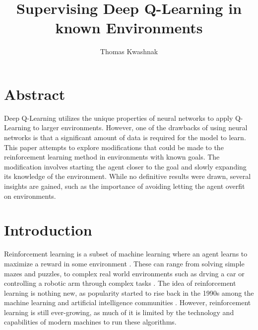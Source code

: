 \documentclass[12pt,letterpaper]{article}
\author{Thomas Kwashnak}
\title{Supervising Deep Q-Learning in known Environments}
\begin{document}
\maketitle

\newpage

\section{Abstract}

Deep Q-Learning utilizes the unique properties of neural networks to apply Q-Learning to larger environments.
However, one of the drawbacks of using neural networks is that a significant amount of data is required for the model to learn. 
This paper attempts to explore modifications that could be made to the reinforcement learning method in environments with known goals.
The modification involves starting the agent closer to the goal and slowly expanding its knowledge of the environment.
While no definitive results were drawn, several insights are gained, such as the importance of avoiding letting the agent overfit on environments.

\section{Introduction}

Reinforcement learning is a subset of machine learning where an agent learns to maximize a reward in some environment \cite{article_reinforcement_learning_survey}.
These can range from solving simple mazes and puzzles, to complex real world environments such as drving a car or controlling a robotic arm through complex tasks \cite{article_deep_learning_hybrid_quantum}.
The idea of reinforcement learning is nothing new, as popularity started to rise back in the 1990s among the machine learning and artificial intelligence communities \cite{article_reinforcement_learning_survey}.
However, reinforcement learning is still ever-growing, as much of it is limited by the technology and capabilities of modern machines to run these algorithms.
\end{document}
